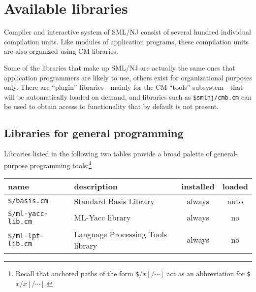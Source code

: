 %
\chapter{Available libraries}

Compiler and interactive system of SML/NJ consist of several hundred
individual compilation units.  Like modules of application programs,
these compilation units are also organized using CM libraries.

Some of the libraries that make up SML/NJ are actually the same ones
that application programmers are likely to use, others exist for
organizational purposes only.  There are ``plugin'' libraries---mainly
for the CM ``tools'' subsystem---that will be automatically loaded on
demand, and libraries such as {\tt \$smlnj/cmb.cm} can be used to
obtain access to functionality that by default is not present.

\section{Libraries for general programming}

Libraries listed in the following two tables provide a broad palette of
general-purpose programming tools:\footnote{
  Recall that anchored paths of the form \texttt{\$$/x[/\cdots]$}
  act as an abbreviation for \texttt{\$$x/x[/\cdots]$}.
}

\newcommand{\CMLIB}[1]{\texttt{\$/#1}}
\begin{small}
\begin{center}
\begin{tabular}{p{1.7in}||p{3.0in}|c|c}
name & description & installed & loaded \\
\hline\hline
\CMLIB{basis.cm} & Standard Basis Library & always & auto \\
\hline\hline
\CMLIB{ml-yacc-lib.cm} & ML-Yacc library & always & no \\
\hline
\CMLIB{ml-lpt-lib.cm} & Language Processing Tools library & always & no \\
\end{tabular}
\end{center}
\end{small}

